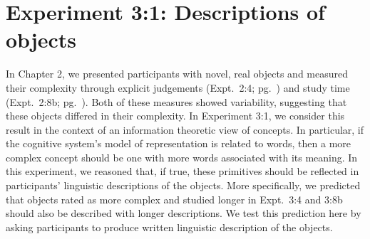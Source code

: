 










\section{Experiment 3:1: Descriptions of objects}
In Chapter 2, we presented participants with novel, real objects and measured their complexity through explicit judgements (Expt.\ 2:4; pg.\ \pageref{ch2-4}) and study time (Expt.\ 2:8b; pg.\ \pageref{ch2-8b}). Both of these measures showed variability, suggesting that these objects differed in their complexity.  In Experiment 3:1, we consider this result in the context of an information theoretic view of concepts. In particular, if the cognitive system's model of representation is related to words, then a more complex concept should be one with more words associated with its meaning. In this experiment, we reasoned that, if true, these primitives should be reflected in participants' linguistic descriptions of the objects. More specifically, we predicted that objects rated as more complex and studied longer in Expt.\ 3:4 and 3:8b should also be described with longer descriptions. We test this prediction here by asking participants to produce written linguistic description of the objects.

